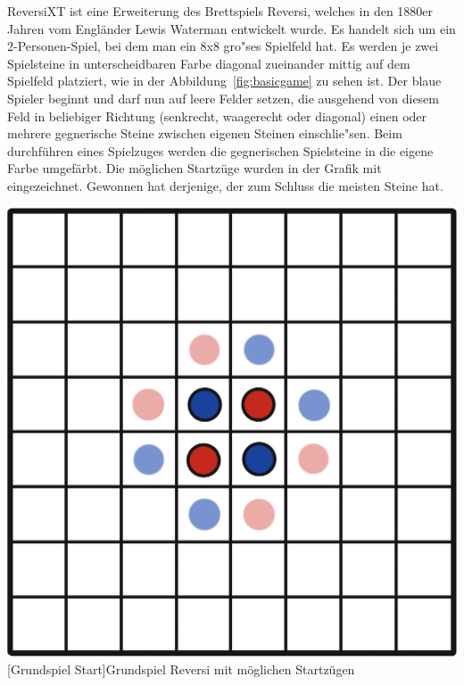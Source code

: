 ReversiXT ist eine Erweiterung des Brettspiels Reversi, welches in den 1880er Jahren vom Engl\"ander Lewis Waterman entwickelt wurde.
Es handelt sich um ein 2-Personen-Spiel, bei dem man ein 8x8 gro"ses Spielfeld hat.
Es werden je zwei Spielsteine in unterscheidbaren Farbe diagonal zueinander mittig auf dem Spielfeld platziert, wie in der Abbildung~\ref{fig:basicgame} zu sehen ist.
Der blaue Spieler beginnt und darf nun auf leere Felder setzen, die ausgehend von diesem Feld in beliebiger Richtung (senkrecht, waagerecht oder diagonal) einen oder mehrere gegnerische Steine zwischen eigenen Steinen einschlie"sen.
Beim durchf\"uhren eines Spielzuges werden die gegnerischen Spielsteine in die eigene Farbe umgef\"arbt.
Die m\"oglichen Startz\"uge wurden in der Grafik mit eingezeichnet.
Gewonnen hat derjenige, der zum Schluss die meisten Steine hat.

\vspace{1em}
\begin{minipage}{\linewidth}
	\centering
	\includegraphics[width=0.5\linewidth]{pics/basicgame-start}
	[Grundspiel Start]{Grundspiel Reversi mit möglichen Startzügen}
	\label{fig:basicgame}
\end{minipage}

